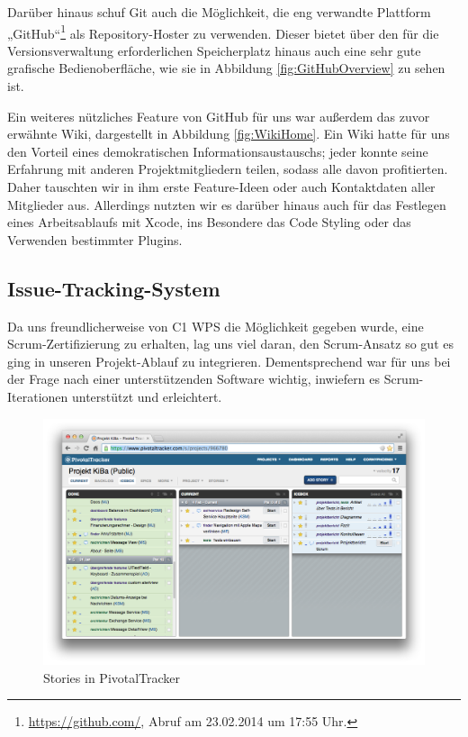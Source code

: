 	Darüber hinaus schuf Git auch die Möglichkeit, die eng verwandte Plattform „GitHub“\footnote{\url{https://github.com/}, Abruf am 23.02.2014 um 17:55 Uhr.} als Repository-Hoster zu verwenden. Dieser bietet über den für die Versionsverwaltung erforderlichen Speicherplatz hinaus auch eine sehr gute grafische Bedienoberfläche, wie sie in Abbildung \ref{fig:GitHubOverview} zu sehen ist.
	
	Ein weiteres nützliches Feature von GitHub für uns war außerdem das zuvor erwähnte Wiki, dargestellt in Abbildung \ref{fig:WikiHome}. Ein Wiki hatte für uns den Vorteil eines demokratischen Informationsaustauschs; jeder konnte seine Erfahrung mit anderen Projektmitgliedern teilen, sodass alle davon profitierten. Daher tauschten wir in ihm erste Feature-Ideen oder auch Kontaktdaten aller Mitglieder aus. Allerdings nutzten wir es darüber hinaus auch für das Festlegen eines Arbeitsablaufs mit Xcode, ins Besondere das Code Styling oder das Verwenden bestimmter Plugins.

\subsection{Issue-Tracking-System}
	Da uns freundlicherweise von C1 WPS die Möglichkeit gegeben wurde, eine Scrum-Zer\-ti\-fi\-zie\-rung zu erhalten, lag uns viel daran, den Scrum-Ansatz so gut es ging in unseren Projekt-Ablauf zu integrieren. Dementsprechend war für uns bei der Frage nach einer unterstützenden Software wichtig, inwiefern es Scrum-Iterationen unterstützt und erleichtert.
	
\begin{figure}[h]
	\centering
	\includegraphics[scale=.25]{Pictures/TrackerStories}
	\vspace{-.8cm}
	\caption{Stories in PivotalTracker\label{fig:TrackerStories}}
\end{figure}
	
